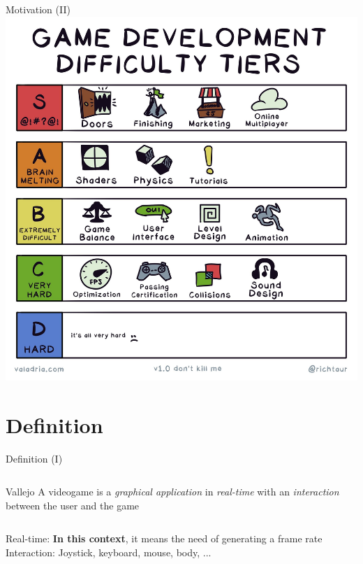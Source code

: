 \documentclass[10pt,compress]{beamer} %
\begin{document}
\begin{frame}{Motivation (II)}
		\centering\includegraphics[width=0.6\linewidth]{figs/difficulty.jpg}
\end{frame}

\section[Definition]{Definition}
\begin{frame}{Definition (I)}
    \begin{columns}
	   \begin{block}{Vallejo}
	   A videogame is a \textit{graphical application} in \textit{real-time} with an \textit{interaction} between the user and the game
	   \end{block}
	\end{columns}
	\bigskip
	Real-time: \textbf{In this context}, it means the need of generating a frame rate\\
	Interaction: Joystick, keyboard, mouse, body, ...
\end{frame}
\end{document}
